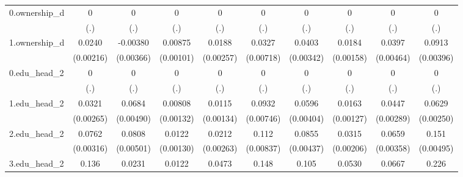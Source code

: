 \begin{table}[htbp]
\begin{tabular}{l*{9}{c}}
0.ownership\_d&           0         &           0         &           0         &           0         &           0         &           0         &           0         &           0         &           0         \\
            &         (.)         &         (.)         &         (.)         &         (.)         &         (.)         &         (.)         &         (.)         &         (.)         &         (.)         \\
1.ownership\_d&      0.0240\sym{***}&    -0.00380         &     0.00875\sym{***}&      0.0188\sym{***}&      0.0327\sym{***}&      0.0403\sym{***}&      0.0184\sym{***}&      0.0397\sym{***}&      0.0913\sym{***}\\
            &   (0.00216)         &   (0.00366)         &   (0.00101)         &   (0.00257)         &   (0.00718)         &   (0.00342)         &   (0.00158)         &   (0.00464)         &   (0.00396)         \\
0.edu\_head\_2&           0         &           0         &           0         &           0         &           0         &           0         &           0         &           0         &           0         \\
            &         (.)         &         (.)         &         (.)         &         (.)         &         (.)         &         (.)         &         (.)         &         (.)         &         (.)         \\
1.edu\_head\_2&      0.0321\sym{***}&      0.0684\sym{***}&     0.00808\sym{***}&      0.0115\sym{***}&      0.0932\sym{***}&      0.0596\sym{***}&      0.0163\sym{***}&      0.0447\sym{***}&      0.0629\sym{***}\\
            &   (0.00265)         &   (0.00490)         &   (0.00132)         &   (0.00134)         &   (0.00746)         &   (0.00404)         &   (0.00127)         &   (0.00289)         &   (0.00250)         \\
2.edu\_head\_2&      0.0762\sym{***}&      0.0808\sym{***}&      0.0122\sym{***}&      0.0212\sym{***}&       0.112\sym{***}&      0.0855\sym{***}&      0.0315\sym{***}&      0.0659\sym{***}&       0.151\sym{***}\\
            &   (0.00316)         &   (0.00501)         &   (0.00130)         &   (0.00263)         &   (0.00837)         &   (0.00437)         &   (0.00206)         &   (0.00358)         &   (0.00495)         \\
3.edu\_head\_2&       0.136\sym{***}&      0.0231\sym{***}&      0.0122\sym{***}&      0.0473\sym{***}&       0.148\sym{***}&       0.105\sym{***}&      0.0530\sym{***}&      0.0667\sym{***}&       0.226\sym{***}\\

\end{tabular}
\end{table}
